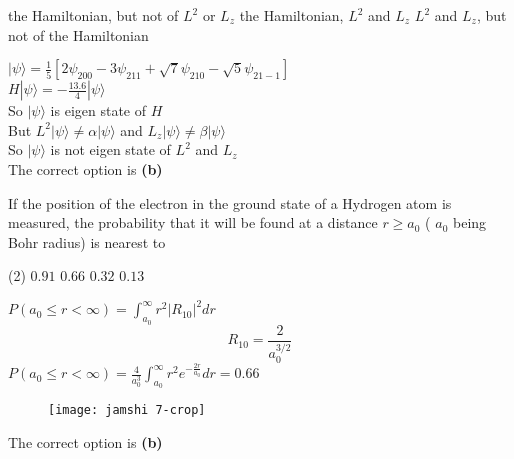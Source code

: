 \begin{enumerate}
\begin{tasks}
	\task[\textbf{B.}]the Hamiltonian, but not of $L^{2}$ or $L_{z}$
	\task[\textbf{C.}]the Hamiltonian, $L^{2}$ and $L_{z}$
	\task[\textbf{D.}]$L^{2}$ and $L_{z}$, but not of the Hamiltonian
\end{tasks}
\begin{answer}
	$|\psi\rangle=\frac{1}{5}\left[2 \psi_{200}-3 \psi_{211}+\sqrt{7} \psi_{210}-\sqrt{5} \psi_{21-1}\right]$\\ $H|\psi\rangle=-\frac{13.6}{4}|\psi\rangle$\\
	So $|\psi\rangle$ is eigen state of $H$\\
	But $L^{2}|\psi\rangle \neq \alpha|\psi\rangle$ and $L_{z}|\psi\rangle \neq \beta|\psi\rangle$\\
	So $|\psi\rangle$ is not eigen state of $L^{2}$ and $L_{z}$\\
	The correct option is \textbf{(b)}
\end{answer}
\begin{minipage}{\textwidth}
	\item If the position of the electron in the ground state of a Hydrogen atom is measured, the probability that it will be found at a distance $r \geq a_{0}$ ( $a_{0}$ being Bohr radius) is nearest to
\end{minipage}
\begin{tasks}(2)
	\task[\textbf{A.}] $0.91$ 
	\task[\textbf{B.}] $0.66$
	\task[\textbf{C.}] $0.32$
	\task[\textbf{D.}]$0.13$
\end{tasks}
\begin{answer}
	\begin{minipage}{0.5\textwidth}
		$P\left(a_{0} \leq r<\infty\right)=\int_{a_{0}}^{\infty} r^{2}\left|R_{10}\right|^{2} d r$
		$$
		R_{10}=\frac{2}{a_{0}^{3 / 2}}
		$$
		$P\left(a_{0} \leq r<\infty\right)=\frac{4}{a_{0}^{3}} \int_{a_{0}}^{\infty} r^{2} e^{-\frac{2 r}{a_{0}}} d r=0.66$\\
	\end{minipage}
	\begin{minipage}{0.5\textwidth}
		\begin{figure}[H]
			\centering
			\texttt{[image: jamshi 7-crop]}
		\end{figure}
	\end{minipage}
	The correct option is \textbf{(b)}
\end{answer}
\end{enumerate}



